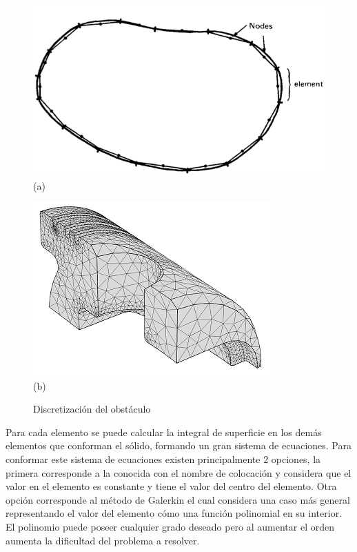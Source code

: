 \documentclass[12pt,letterpaper]{article}
\numberwithin{equation}{section}
\begin{document}
\begin{figure}[H]
	\begin{minipage}{0.5\linewidth}
	\centering\includegraphics[scale=0.35]{Imagenes/discretizacion_2D.png}\\
		\centering(a)
	\end{minipage}
	\begin{minipage}{0.5\linewidth}
	\centering\includegraphics[scale=0.8]{Imagenes/discretizacion_3D.png}\\
		\centering(b)
	\end{minipage}
	\caption{Discretización del obstáculo}
	\label{fig:discretizacion_omega}
\end{figure}

Para cada elemento se puede calcular la integral de superficie en los demás elementos que conforman el sólido, formando un gran sistema de ecuaciones. Para conformar este sistema de ecuaciones existen principalmente 2 opciones, la primera corresponde a la conocida con el nombre de colocación y considera que el valor en el elemento es constante y tiene el valor del centro del elemento. Otra opción corresponde al método de Galerkin el cual considera una caso más general representando el valor del elemento cómo una función polinomial en su interior. El polinomio puede poseer cualquier grado deseado pero al aumentar el orden aumenta la dificultad del problema a resolver.
\end{document}
